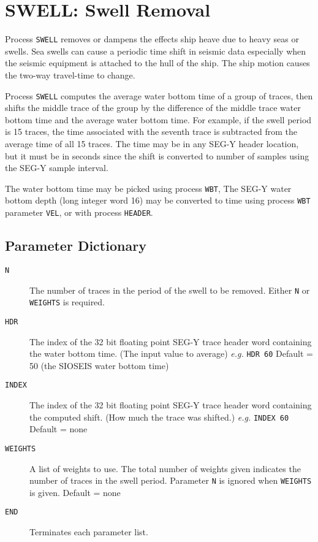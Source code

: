 \section{SWELL: Swell Removal}
\label{cmd_swell}

     Process \texttt{SWELL} removes or dampens the effects ship heave due to
heavy seas or swells.  Sea swells can cause a periodic time shift in
seismic data especially when the seismic equipment is attached to the
hull of the ship.  The ship motion causes the two-way travel-time to
change.

     Process \texttt{SWELL} computes the average water bottom time of a group of
traces, then shifts the middle trace of the group by the difference of
the middle trace water bottom time and the average water bottom time.
For example, if the swell period is 15 traces, the time associated with
the seventh trace is subtracted from the average time of all 15 traces.
The time may be in any SEG-Y header location, but it must be in
seconds since the shift is converted to number of samples using the
SEG-Y sample interval.

     The water bottom time may be picked using process \texttt{WBT},  The SEG-Y
water bottom depth (long integer word 16) may be converted to time using
process \texttt{WBT} parameter \texttt{VEL}, or with process \texttt{HEADER}.


\subsection{Parameter Dictionary}

\begin{description}
    \item[\texttt{N}] The number of traces in the period of the swell to be removed.
        Either \texttt{N} or \texttt{WEIGHTS} is required.

\item[\texttt{HDR}] The index of the 32 bit floating point SEG-Y trace header word
         containing the water bottom time.  (The input value to average)
         \textit{e.g.} \texttt{HDR 60}
         Default = 50 (the SIOSEIS water bottom time)

\item[\texttt{INDEX}] The index of the 32 bit floating point SEG-Y trace header word
         containing the computed shift.  (How much the trace was shifted.)
         \textit{e.g.} \texttt{INDEX 60}
         Default = none

\item[\texttt{WEIGHTS}] A list of weights to use.  The total number of weights given
         indicates the number of traces in the swell period.
         Parameter \texttt{N} is ignored when \texttt{WEIGHTS} is given.
         Default = none

\item[\texttt{END}] Terminates each parameter list.
\end{description}

